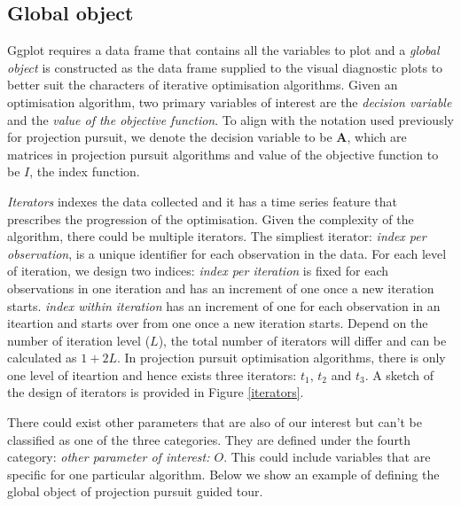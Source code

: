 \documentclass[12pt]{article}
\begin{document}
\hypertarget{global-object}{%
\subsection{Global object}\label{global-object}}

Ggplot requires a data frame that contains all the variables to plot and
a \emph{global object} is constructed as the data frame supplied to the
visual diagnostic plots to better suit the characters of iterative
optimisation algorithms. Given an optimisation algorithm, two primary
variables of interest are the \emph{decision variable} and the
\emph{value of the objective function}. To align with the notation used
previously for projection pursuit, we denote the decision variable to be
\(\mathbf{A}\), which are matrices in projection pursuit algorithms and
value of the objective function to be \(I\), the index function.

\emph{Iterators} indexes the data collected and it has a time series
feature that prescribes the progression of the optimisation. Given the
complexity of the algorithm, there could be multiple iterators. The
simpliest iterator: \emph{index per observation}, is a unique identifier
for each observation in the data. For each level of iteration, we design
two indices: \emph{index per iteration} is fixed for each observations
in one iteration and has an increment of one once a new iteration
starts. \emph{index within iteration} has an increment of one for each
observation in an iteartion and starts over from one once a new
iteration starts. Depend on the number of iteration level (\(L\)), the
total number of iterators will differ and can be calculated as
\(1 + 2L\). In projection pursuit optimisation algorithms, there is only
one level of iteartion and hence exists three iterators: \(t_1\),
\(t_2\) and \(t_3\). A sketch of the design of iterators is provided in
Figure \ref{iterators}.

There could exist other parameters that are also of our interest but
can't be classified as one of the three categories. They are defined
under the fourth category: \emph{other parameter of interest: \(O\)}.
This could include variables that are specific for one particular
algorithm. Below we show an example of defining the global object of
projection pursuit guided tour.
\end{document}
